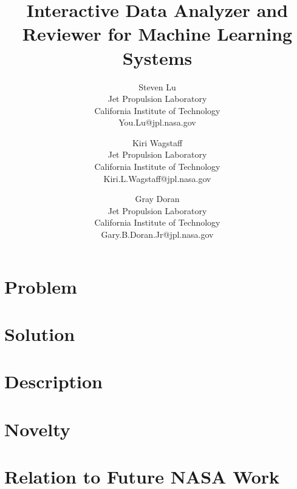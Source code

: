 \documentclass[twocolumn,letterpaper]{IEEEAerospaceCLS}
\begin{document}
\title{Interactive Data Analyzer and Reviewer for Machine Learning Systems}

\author{
Steven Lu\\ 
Jet Propulsion Laboratory\\
California Institute of Technology\\
You.Lu@jpl.nasa.gov
\and 
Kiri Wagstaff\\
Jet Propulsion Laboratory\\
California Institute of Technology\\
Kiri.L.Wagstaff@jpl.nasa.gov
\and
Gray Doran\\
Jet Propulsion Laboratory\\
California Institute of Technology\\
Gary.B.Doran.Jr@jpl.nasa.gov
}

\maketitle

\thispagestyle{plain}
\pagestyle{plain}
\section{Problem}

\section{Solution}

\section{Description}

\section{Novelty}

\section{Relation to Future NASA Work}

\end{document}
